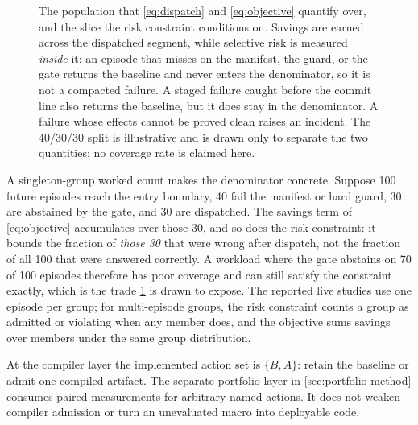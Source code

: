 \begin{figure}[t]
  \centering
  
  \caption{The population that \eqref{eq:dispatch} and \eqref{eq:objective} quantify
  over, and the slice the risk constraint conditions on.  Savings are earned across the dispatched segment, while selective risk
  is measured \emph{inside} it: an episode that misses on the manifest, the guard, or the
  gate returns the baseline and never enters the denominator, so it is not a compacted
  failure.  A staged failure caught before the commit line also returns the baseline, but
  it does stay in the denominator. A failure whose effects cannot be proved clean
  raises an incident.
  The 40/30/30 split is illustrative and is drawn only to separate the two quantities; no
  coverage rate is claimed here.}
  \label{fig:dispatch-population}
\end{figure}

A singleton-group worked count makes the denominator concrete.  Suppose 100 future episodes reach the
entry boundary, 40 fail the manifest or hard guard, 30 are abstained by the gate, and 30
are dispatched.  The savings term of \eqref{eq:objective} accumulates over those 30, and
so does the risk constraint: it bounds the fraction of \emph{those 30} that were wrong
after dispatch, not the fraction of all 100 that were answered correctly.  A workload
where the gate abstains on 70 of 100 episodes therefore has poor coverage and can still
satisfy the constraint exactly, which is the trade \cref{fig:dispatch-population} is drawn
to expose. The reported live studies use one episode per group; for multi-episode groups,
the risk constraint counts a group as admitted or violating when any member does,
and the objective sums savings over members under the same group distribution.

At the compiler layer the implemented action set is $\{B,A\}$: retain the baseline or
admit one compiled artifact.  The separate portfolio layer in
\cref{sec:portfolio-method} consumes paired measurements for arbitrary named actions.  It
does not weaken compiler admission or turn an unevaluated macro into deployable code.

